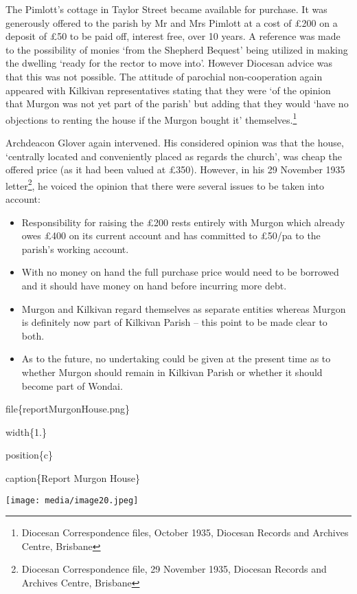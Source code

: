 The Pimlott's cottage in Taylor Street became available for purchase. It was generously offered to the parish by Mr and Mrs Pimlott at a cost of £200 on a deposit of £50 to be paid off, interest free, over 10 years. A reference was made to the possibility of monies `from the Shepherd Bequest' being utilized in making the dwelling `ready for the rector to move into'. However Diocesan advice was that this was not possible. The attitude of parochial non-cooperation again appeared with Kilkivan representatives stating that they were `of the opinion that Murgon was not yet part of the parish' but adding that they would `have no objections to renting the house if the Murgon bought it' themselves.\footnote{Diocesan Correspondence files, October 1935, Diocesan Records and Archives Centre, Brisbane}

Archdeacon Glover again intervened. His considered opinion was that the house, `centrally located and conveniently placed as regards the church', was cheap the offered price (as it had been valued at £350). However, in his 29 November 1935 letter\footnote{Diocesan Correspondence file, 29 November 1935, Diocesan Records and Archives Centre, Brisbane}, he voiced the opinion that there were several issues to be taken into account:

\begin{itemize}
\item
  Responsibility for raising the £200 rests entirely with Murgon which already owes £400 on its current account and has committed to £50/pa to the parish's working account.
\item
  With no money on hand the full purchase price would need to be borrowed and it should have money on hand before incurring more debt.
\item
  Murgon and Kilkivan regard themselves as separate entities whereas Murgon is definitely now part of Kilkivan Parish -- this point to be made clear to both.
\item
  As to the future, no undertaking could be given at the present time as to whether Murgon should remain in Kilkivan Parish or whether it should become part of Wondai.
\end{itemize}

file\{reportMurgonHouse.png\}

width\{1.\}

position\{c\}

caption\{Report Murgon House\}

\texttt{[image: media/image20.jpeg]}


